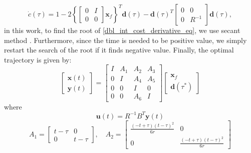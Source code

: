 \documentclass[conference]{IEEEtran}
\begin{document}
\begin{equation} \label{dbl_int_cost_derivative_eq}
\dot{c}(\tau) = 1-2\left \{ \begin{bmatrix}
0 & I \\
0 & 0 
\end{bmatrix}
\boldsymbol{x}_f
\right \}^{T}\boldsymbol{d}(\tau)-
\boldsymbol{d}(\tau)^{T}
\begin{bmatrix}
0 & 0 \\
0 & R^{-1}
\end{bmatrix}
\boldsymbol{d}(\tau),
\end{equation}
in this work, to find the root of \eqref{dbl_int_cost_derivative_eq}, we use secant method \cite{chapra1998numerical}. Furthermore, since the time is needed to be positive value, we simply restart the search of the root if it finds negative value. Finally, the optimal trajectory is given by:
\begin{equation} \label{dbl_int_composite_state_eq}
\begin{bmatrix}
\boldsymbol{x}(t)\\
\boldsymbol{y}(t)
\end{bmatrix}
=
\begin{bmatrix}
I &
A_1 & A_2 & A_3
\\
0 & I & A_4 & A_5 \\
0 & 0 & I & 0 \\
0 & 0 & A_6 & I
\end{bmatrix}
\begin{bmatrix}
\boldsymbol{x}_f\\
\boldsymbol{d}(\tau^{*})
\end{bmatrix}
\end{equation}
where 
\begin{equation} \label{u_eq}
\boldsymbol{u}(t) = R^{-1}B^{T}\boldsymbol{y}(t)
\end{equation}
\begin{equation*}
A_1 = 
\begin{bmatrix}
t-\tau & 0 \\
0 & t-\tau
\end{bmatrix}
,\quad
A_2 = 
\begin{bmatrix}
\frac{(-t+\tau)(t-\tau)^2}{6r} & 0 \\
0 & \frac{(-t+\tau)(t-\tau)^2}{6r}
\end{bmatrix}
\end{equation*}
\end{document}
